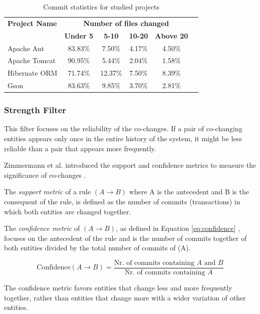 \documentclass{ieeeaccess}
\begin{document}
\begin{table}[ht]
    \centering
    \caption{Commit statistics for studied projects}
    \label{tab:commit_statistics}
    \begin{tabular}{|l|c|c|c|c|c|}
        \hline
	 \textbf{Project Name} & \multicolumn{4}{c|}{\textbf{{Number of files changed} }}  \\ 
	\cline{2-5}
         & \textbf{Under 5} & \textbf{5-10} & \textbf{10-20} & \textbf{Above 20} \\ \hline
        Apache Ant & 83.83\% & 7.50\% & 4.17\% & 4.50\% \\ 
        Apache Tomcat & 90.95\% & 5.44\% & 2.04\% & 1.58\%  \\ 
        Hibernate ORM & 71.74\% & 12.37\% & 7.50\% & 8.39\%  \\ 
        Gson & 83.63\% & 9.85\% & 3.70\% & 2.81\%  \\ \hline
    \end{tabular}
\end{table}


\subsubsection{Strength Filter}

This filter focuses on the reliability of the co-changes. If a pair of co-changing entities appears only once in the entire history of the system, it might be less reliable than a pair that appears more frequently.

Zimmermann et al. introduced the support and confidence metrics to measure the significance of co-changes \cite{b7}.

The \textit{support metric} of a rule $(A \rightarrow B)$ where A is the antecedent and B is the consequent of the rule, is defined as the number of commits (transactions) in which both entities are changed together.

The \textit{confidence metric} of $(A \rightarrow B)$, as defined in Equation \eqref{eq:confidence} , focuses on the antecedent of the rule and is the number of commits together of both entities divided by the total number of commits of (A).


\begin{equation}
\text{Confidence}(A \rightarrow B) = \frac{\text{Nr. of commits containing } A \text{ and } B}{\text{Nr. of commits containing } A}
\label{eq:confidence}
\end{equation}


The confidence metric favors entities that change less and more frequently together, rather than entities that change more with a wider variation of other entities.
\end{document}
